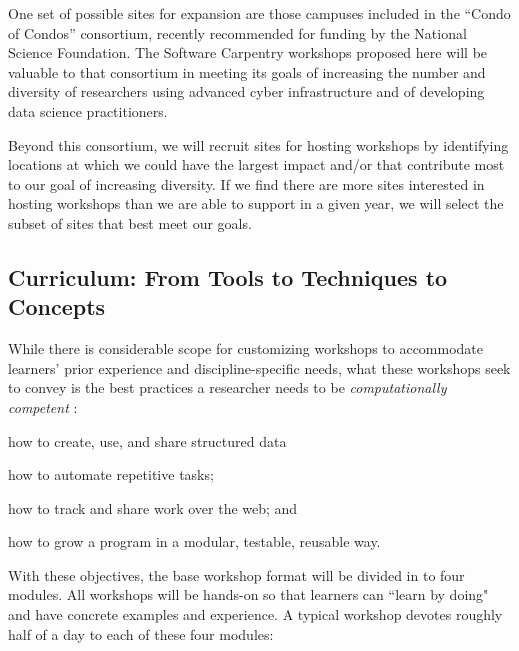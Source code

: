 \documentclass{proposalnsf}
\newlength{\up}
\begin{document}
One set of possible sites for expansion are those campuses included in
the ``Condo of Condos'' consortium, recently recommended for funding
by the National Science Foundation.  The Software Carpentry workshops
proposed here will be valuable to that consortium in meeting its goals
of increasing the number and diversity of researchers using advanced
cyber infrastructure and of developing data science practitioners.

Beyond this consortium, we will recruit sites for hosting workshops by identifying locations at which we could have the largest impact and/or that contribute most to our goal of increasing diversity. If we find there are more sites interested in hosting workshops than we are able to support in a given year, we will select the subset of sites that best meet our goals.

\subsection{Curriculum: From Tools to Techniques to Concepts}
\label{sec:workshops}

While there is considerable scope for customizing workshops to
accommodate learners' prior experience and discipline-specific needs,
what these workshops seek to convey is the best
practices a researcher needs to be \emph{computationally competent}
\cite{wilson2013}:

\begin{compactitem}
\item
  how to create, use, and share structured data
\item
  how to automate repetitive tasks; 
\item
  how to track and share work over the web; and
\item
  how to grow a program in a modular, testable, reusable way.
\end{compactitem}

With these objectives, the base workshop format will be divided in to four modules.  All workshops will be hands-on so that learners can ``learn by doing" and have concrete examples and experience. A typical workshop devotes roughly half of a day to each of these four modules:
\end{document}
